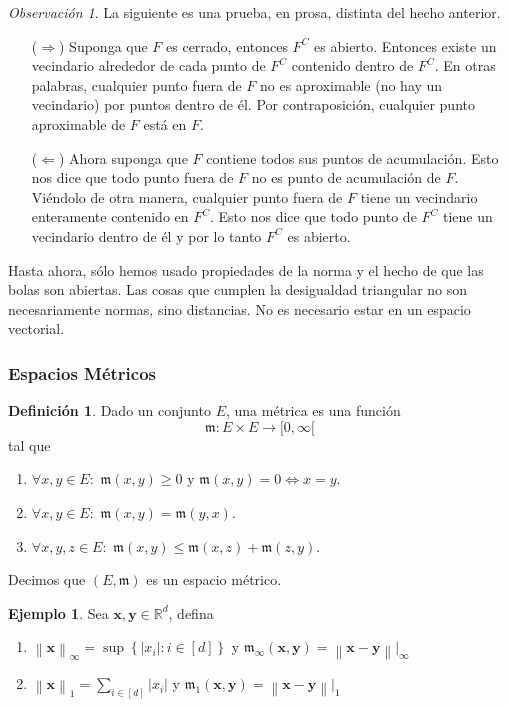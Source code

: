 \documentclass[12pt]{article}
\theoremstyle{plain}
\theoremstyle{definition}
\newtheorem{Def}[Th]{Definición}       %
\newtheorem{Ex}[Th]{Ejemplo}               %
\theoremstyle{remark}
\newtheorem{Rmk}[Th]{Observación}      %
\numberwithin{equation}{section}
\newcommand{\bR}{\mathbb{R}}        %
\newcommand{\mm}{\mathfrak{m}}      %
\renewcommand{\geq}{\geqslant}      %
\renewcommand{\leq}{\leqslant}      %
\renewcommand{\:}{\colon}           %
\renewcommand{\vec}[1]{\mathbf{#1}}
\newcommand{\vx}{\vec{x}}           %
\newcommand{\vy}{\vec{y}}
\newcommand{\conj}[1]{\left\lbrace#1\right\rbrace}
\newcommand{\bonj}[1]{\left\lbrack#1\right\rbrack}
\newcommand{\nm}[1]{\left\|#1\right\|} %
\begin{document}
\begin{multicols}{2}
\begin{ptcbp}
\end{ptcbp}

\begin{Rmk}
  La siguiente es una prueba, en prosa, distinta del hecho anterior.
\end{Rmk}

\begin{ptcb}
\begin{enumerate}
  \item[($\Rightarrow$)] Suponga que $F$ es cerrado, entonces $F^C$ es abierto. Entonces existe un vecindario alrededor de cada punto de $F^C$ contenido dentro de $F^C$. En otras palabras, cualquier punto fuera de $F$ no es aproximable (no hay un vecindario) por puntos dentro de él. Por contraposición, cualquier punto aproximable de $F$ está en $F$.
  \item[($\Leftarrow$)] Ahora suponga que $F$ contiene todos sus puntos de acumulación. Esto nos dice que todo punto fuera de $F$ no es punto de acumulación de $F$. Viéndolo de otra manera, cualquier punto fuera de $F$ tiene un vecindario enteramente contenido en $F^C$. Esto nos dice que todo punto de $F^C$ tiene un vecindario dentro de él y por lo tanto $F^C$ es abierto.
\end{enumerate}
\end{ptcb}
Hasta ahora, sólo hemos usado propiedades de la norma y el hecho de que las bolas son abiertas. Las cosas que cumplen la desigualdad triangular no son necesariamente normas, sino distancias. No es necesario estar en un espacio vectorial.

\subsubsection*{Espacios Métricos}

\begin{Def}
  Dado un conjunto $E$, una métrica es una función $$\mm\colon E\times E\to \lbrack 0,\infty\lbrack$$ tal que
  \begin{enumerate}
    \item $\forall x,y\in E\colon\,\, \mm(x,y)\geq 0$ y $\mm(x,y) =0\iff x=y$.
    \item $\forall x,y\in E\colon\,\, \mm(x,y) = \mm(y,x)$.
    \item $\forall x,y,z\in E\colon\,\, \mm(x,y)\leq \mm(x,z)+\mm(z,y)$.
  \end{enumerate}
  Decimos que $(E,\mm)$ es un espacio métrico.
\end{Def}

\begin{Ex}
Sea $\vec{x},\vy\in\bR^d$, defina
  \begin{enumerate}
    \item $\nm{\vx}_\infty = \sup\conj{|x_i|\colon i\in\bonj{d}}$ y $\mm_\infty(\vx,\vy)=\nm{\vx-\vy}|_\infty$
    \item $\nm{\vx}_1 = \sum_{i\in\bonj{d}}|x_i|$ y $\mm_1(\vx,\vy)=\nm{\vx-\vy}|_1$
  \end{enumerate}
\end{Ex}


\end{multicols}
\end{document}

